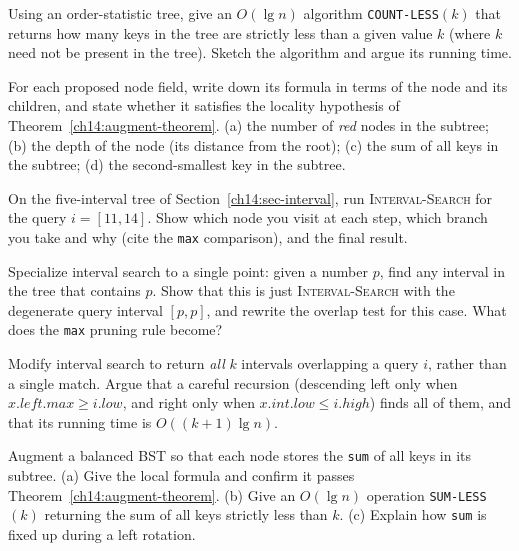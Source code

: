 \begin{exercise}
Using an order-statistic tree, give an $O(\lg n)$ algorithm \texttt{COUNT-LESS}$(k)$
that returns how many keys in the tree are strictly less than a given value $k$
(where $k$ need not be present in the tree). Sketch the algorithm and argue its
running time.
\end{exercise}

\begin{exercise}
For each proposed node field, write down its formula in terms of the node and its
children, and state whether it satisfies the locality hypothesis of
Theorem~\ref{ch14:augment-theorem}. (a) the number of \emph{red} nodes in the
subtree; (b) the depth of the node (its distance from the root); (c) the sum of
all keys in the subtree; (d) the second-smallest key in the subtree.
\end{exercise}

\begin{exercise}
On the five-interval tree of Section~\ref{ch14:sec-interval}, run \textsc{Interval-Search}
for the query $i = [11, 14]$. Show which node you visit at each step, which
branch you take and why (cite the \texttt{max} comparison), and the final
result.
\end{exercise}

\begin{exercise}
Specialize interval search to a single point: given a number $p$, find any
interval in the tree that contains $p$. Show that this is just
\textsc{Interval-Search} with the degenerate query interval $[p, p]$, and rewrite
the overlap test for this case. What does the \texttt{max} pruning rule become?
\end{exercise}

\begin{exercise}
\label{ch14:ex-alloverlaps}
Modify interval search to return \emph{all} $k$ intervals overlapping a query $i$,
rather than a single match. Argue that a careful recursion (descending left only when
$x.\mathit{left}.\mathit{max} \ge i.\mathit{low}$, and right only when
$x.\mathit{int}.\mathit{low} \le i.\mathit{high}$) finds all of them, and that its
running time is $O((k+1)\lg n)$.
\end{exercise}

\begin{exercise}
Augment a balanced BST so that each node stores the \texttt{sum} of all keys in
its subtree. (a) Give the local formula and confirm it passes
Theorem~\ref{ch14:augment-theorem}. (b) Give an $O(\lg n)$ operation
\texttt{SUM-LESS}$(k)$ returning the sum of all keys strictly less than $k$.
(c) Explain how \texttt{sum} is fixed up during a left rotation.
\end{exercise}

